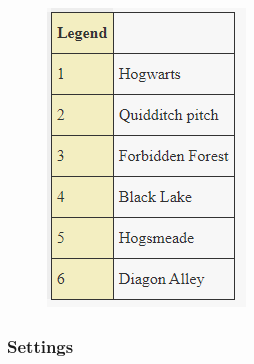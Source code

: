 \begin{figure}[H]
\includegraphics[max width=\textwidth]{../Pictures/Maps/Legend_map.png}
\end{figure}

\pagebreak

\subsubsection{Settings}
